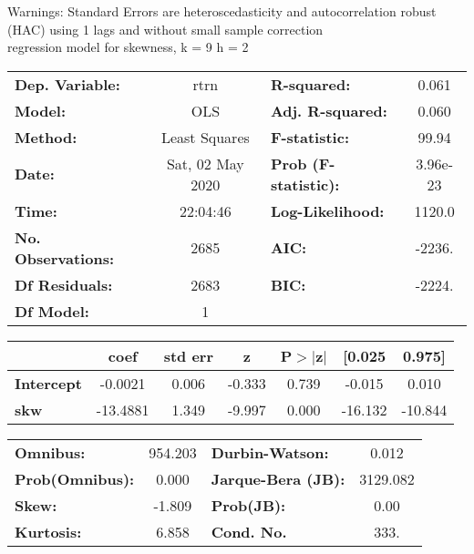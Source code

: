Warnings: \newline
 [1] Standard Errors are heteroscedasticity and autocorrelation robust (HAC) using 1 lags and without small sample correction\\ 

regression model for skewness, k = 9 h = 2\begin{center}
\begin{tabular}{lclc}
\toprule
\textbf{Dep. Variable:}    &       rtrn       & \textbf{  R-squared:         } &     0.061   \\
\textbf{Model:}            &       OLS        & \textbf{  Adj. R-squared:    } &     0.060   \\
\textbf{Method:}           &  Least Squares   & \textbf{  F-statistic:       } &     99.94   \\
\textbf{Date:}             & Sat, 02 May 2020 & \textbf{  Prob (F-statistic):} &  3.96e-23   \\
\textbf{Time:}             &     22:04:46     & \textbf{  Log-Likelihood:    } &    1120.0   \\
\textbf{No. Observations:} &        2685      & \textbf{  AIC:               } &    -2236.   \\
\textbf{Df Residuals:}     &        2683      & \textbf{  BIC:               } &    -2224.   \\
\textbf{Df Model:}         &           1      & \textbf{                     } &             \\
\bottomrule
\end{tabular}
\begin{tabular}{lcccccc}
                   & \textbf{coef} & \textbf{std err} & \textbf{z} & \textbf{P$> |$z$|$} & \textbf{[0.025} & \textbf{0.975]}  \\
\midrule
\textbf{Intercept} &      -0.0021  &        0.006     &    -0.333  &         0.739        &       -0.015    &        0.010     \\
\textbf{skw}       &     -13.4881  &        1.349     &    -9.997  &         0.000        &      -16.132    &      -10.844     \\
\bottomrule
\end{tabular}
\begin{tabular}{lclc}
\textbf{Omnibus:}       & 954.203 & \textbf{  Durbin-Watson:     } &    0.012  \\
\textbf{Prob(Omnibus):} &   0.000 & \textbf{  Jarque-Bera (JB):  } & 3129.082  \\
\textbf{Skew:}          &  -1.809 & \textbf{  Prob(JB):          } &     0.00  \\
\textbf{Kurtosis:}      &   6.858 & \textbf{  Cond. No.          } &     333.  \\
\bottomrule
\end{tabular}
\end{center}

